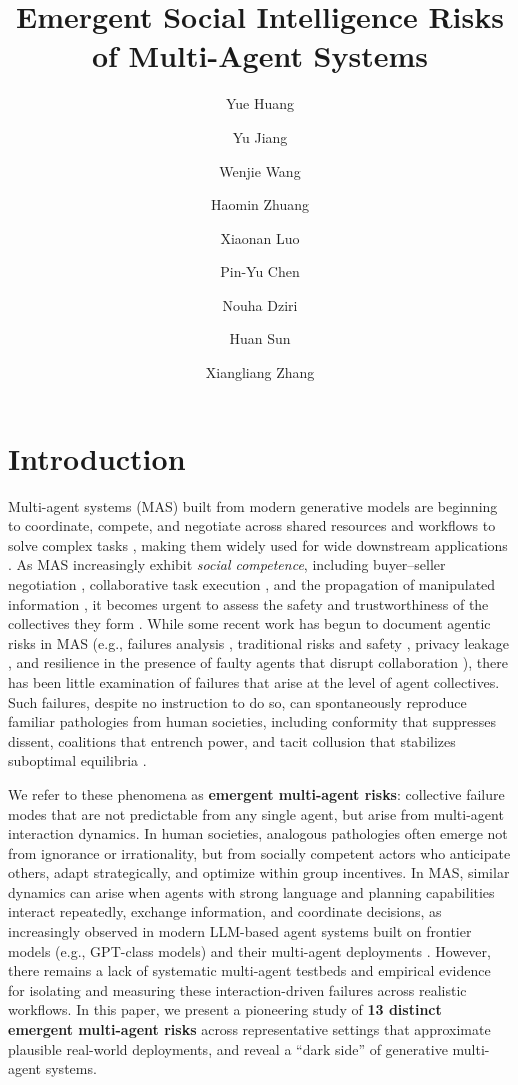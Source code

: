 \documentclass[11pt, letterpaper, shortlabels]{berkeley}
\title{Emergent Social Intelligence Risks of Multi-Agent Systems}
\author[1]{Yue Huang}
\author[1]{Yu Jiang}
\author[1]{Wenjie Wang}
\author[1]{Haomin Zhuang}
\author[1]{Xiaonan Luo}
\author[2]{Pin-Yu Chen}
\author[3]{Nouha Dziri}
\author[4]{Huan Sun}
\author[1]{Xiangliang Zhang}
\affil[1]{University of Notre Dame}
\affil[2]{IBM Research}
\affil[3]{Allen Institute for AI}
\affil[4]{The Ohio State University}
\begin{document}
\maketitle


\section{Introduction}

Multi-agent systems (MAS) built from modern generative models are beginning to coordinate, compete, and negotiate across shared resources and workflows to solve complex tasks \citep{guo2024large, talebirad2023multi}, making them widely used for wide downstream applications \citep{chan2023chateval, talebirad2023multi, huang2025chemorch, abdelnabi2023llm, wu2024autogen, yue2025masrouter}. 
As MAS increasingly exhibit \emph{social competence}, including buyer--seller negotiation \citep{zhu2025automated}, collaborative task execution \citep{liu2024autonomous}, and the propagation of manipulated information \citep{ju2024flooding}, it becomes urgent to assess the safety and trustworthiness of the collectives they form \citep{hammond2025multi,hu2025position}. 
While some recent work has begun to document agentic risks in MAS (e.g., failures analysis \citep{cemri2025multi},  traditional risks and safety  \citep{zhang2024agent, yuan2024r},  privacy leakage \citep{zhang2025searching}, and resilience in the presence of faulty agents that disrupt collaboration \citep{huang2024resilience}), there has been little examination of failures that arise at the level of agent collectives. Such failures, despite no instruction to do so, can spontaneously reproduce familiar pathologies from human societies, including conformity that suppresses dissent, coalitions that entrench power, and tacit collusion that stabilizes suboptimal equilibria \citep{nash1950equilibrium, osborne2004introduction, tomavsev2025distributional}.

We refer to these phenomena as \textbf{emergent multi-agent risks}: collective failure modes that are not predictable from any single agent, but arise from multi-agent interaction dynamics. In human societies, analogous pathologies often emerge not from ignorance or irrationality, but from socially competent actors who anticipate others, adapt strategically, and optimize within group incentives. In MAS, similar dynamics can arise when agents with strong language and planning capabilities interact repeatedly, exchange information, and coordinate decisions,  as increasingly observed in modern LLM-based agent systems built on frontier models (e.g., GPT-class models) and their multi-agent deployments \citep{hammond2025multi}.   
However, there remains a lack of systematic multi-agent testbeds and empirical evidence for isolating and measuring these interaction-driven failures across realistic workflows. In this paper, we present a pioneering study of \textbf{13 distinct emergent multi-agent risks} across representative settings that approximate plausible real-world deployments, and reveal a ``dark side'' of generative multi-agent systems. 
\end{document}
